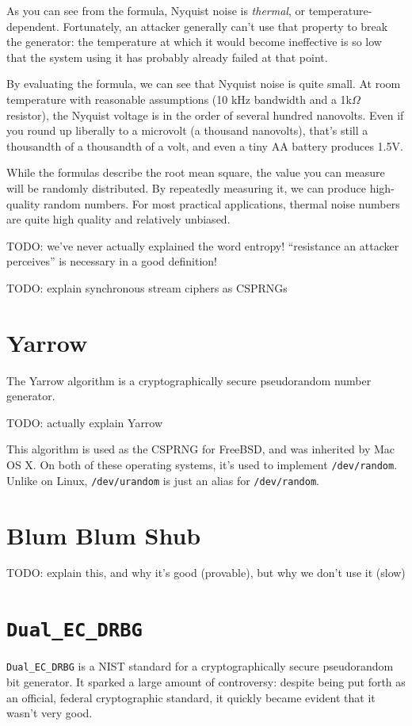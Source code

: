 \documentclass[11pt,ebook,table,dvipsnames]{memoir}
\begin{document}
As you can see from the formula, Nyquist noise is \emph{thermal}, or
temperature-dependent. Fortunately, an attacker generally can't use
that property to break the generator: the temperature at which it
would become ineffective is so low that the system using it has
probably already failed at that point.

By evaluating the formula, we can see that Nyquist noise is quite
small. At room temperature with reasonable assumptions (10 kHz
bandwidth and a 1k$\Omega$ resistor), the Nyquist voltage is in the
order of several hundred nanovolts. Even if you round up liberally to
a microvolt (a thousand nanovolts), that's still a thousandth of a
thousandth of a volt, and even a tiny AA battery produces 1.5V.

While the formulas describe the root mean square, the value you can
measure will be randomly distributed. By repeatedly measuring it, we
can produce high-quality random numbers. For most practical
applications, thermal noise numbers are quite high quality and
relatively unbiased.

TODO: we've never actually explained the word entropy! \enquote{resistance an
attacker perceives} is necessary in a good definition!

TODO: explain synchronous stream ciphers as CSPRNGs
\section{Yarrow}
\label{sec-2-10-3}

The Yarrow algorithm is a cryptographically secure pseudorandom number
generator.

TODO: actually explain Yarrow

This algorithm is used as the CSPRNG for FreeBSD, and was inherited by
Mac OS X. On both of these operating systems, it's used to implement
\verb|/dev/random|. Unlike on Linux, \verb|/dev/urandom| is just an
alias for \verb|/dev/random|.
\section{Blum Blum Shub}
\label{sec-2-10-4}

TODO: explain this, and why it's good (provable), but why we don't use
it (slow)
\section{\texttt{Dual\_EC\_DRBG}}
\label{sec-2-10-5}

\texttt{Dual\_EC\_DRBG} is a NIST standard for a cryptographically secure
pseudorandom bit generator. It sparked a large amount of controversy:
despite being put forth as an official, federal cryptographic
standard, it quickly became evident that it wasn't very good.
\end{document}
